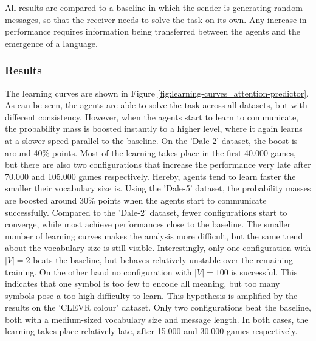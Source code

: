 \documentclass[11pt]{article}
\begin{document}
All results are compared to a baseline in which the sender is generating random messages, so that the receiver needs to solve the task on its own.
Any increase in performance requires information being transferred between the agents and the emergence of a language.


\subsubsection*{Results}
The learning curves are shown in Figure \ref{fig:learning-curves_attention-predictor}.
As can be seen, the agents are able to solve the task across all datasets, but with different consistency.
However, when the agents start to learn to communicate, the probability mass is boosted instantly to a higher level, where it again learns at a slower speed parallel to the baseline.
On the 'Dale-2' dataset, the boost is around 40\% points.
Most of the learning takes place in the first 40.000 games, but there are also two configurations that increase the performance very late after 70.000 and 105.000 games respectively.
Hereby, agents tend to learn faster the smaller their vocabulary size is.
Using the 'Dale-5' dataset, the probability masses are boosted around 30\% points when the agents start to communicate successfully.
Compared to the 'Dale-2' dataset, fewer configurations start to converge, while most achieve performances close to the baseline. %
The smaller number of learning curves makes the analysis more difficult, but the same trend about the vocabulary size is still visible.
Interestingly, only one configuration with $|V|=2$ beats the baseline, but behaves relatively unstable over the remaining training.
On the other hand no configuration with $|V|=100$ is successful.
This indicates that one symbol is too few to encode all meaning, but too many symbols pose a too high difficulty to learn.
This hypothesis is amplified by the results on the 'CLEVR colour' dataset.
Only two configurations beat the baseline, both with a medium-sized vocabulary size and message length.
In both cases, the learning takes place relatively late, after 15.000 and 30.000 games respectively.
\end{document}
